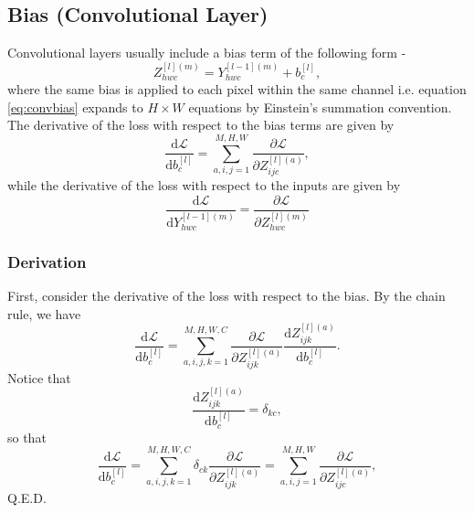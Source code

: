 \documentclass[modern]{aastex61}
\newcommand{\uderivative}{\mathrm{d}}
\begin{document}
\subsection{Bias (Convolutional Layer)} \label{sec:bias}

Convolutional layers usually include a bias term of the following form -
\begin{equation} \label{eq:convbias}
  Z^{[l](m)}_{hwc} = Y^{[l-1](m)}_{hwc} + b^{[l]}_{c},
\end{equation}
where the same bias is applied to each pixel within the same channel i.e. equation \eqref{eq:convbias} expands to $H \times W$ equations by Einstein's summation convention. The derivative of the loss with respect to the bias terms are given by
\begin{equation} \label{eq:gradconvbias}
  \frac{\uderivative \mathscr{L}}{\uderivative b^{[l]}_{c}} = \sum_{a, i, j = 1}^{M, H, W} \frac{\partial \mathscr{L}}{\partial Z^{[l](a)}_{ijc}},
\end{equation}
while the derivative of the loss with respect to the inputs are given by
\begin{equation} \label{eq:propconvbias}
  \frac{\uderivative \mathscr{L}}{\uderivative Y^{[l-1](m)}_{hwc}} = \frac{\partial \mathscr{L}}{\partial  Z^{[l](m)}_{hwc}}
\end{equation}

\subsubsection{Derivation}
First, consider the derivative of the loss with respect to the bias. By the chain rule, we have
\begin{equation*}
  \frac{\uderivative \mathscr{L}}{\uderivative b^{[l]}_{c}} = \sum_{a, i, j, k = 1}^{M, H, W, C} \frac{\partial \mathscr{L}}{\partial Z^{[l](a)}_{ijk}} \frac{\uderivative Z^{[l](a)}_{ijk}}{\uderivative b^{[l]}_{c}}.
\end{equation*}
Notice that
\begin{equation*}
  \frac{\uderivative Z^{[l](a)}_{ijk}}{\uderivative b^{[l]}_{c}} = \delta_{kc},
\end{equation*} so that
\begin{equation*}
  \frac{\uderivative \mathscr{L}}{\uderivative b^{[l]}_{c}} = \sum_{a, i, j, k = 1}^{M, H, W, C} \delta_{ck} \frac{\partial \mathscr{L}}{\partial Z^{[l](a)}_{ijk}} = \sum_{a, i, j = 1}^{M, H, W} \frac{\partial \mathscr{L}}{\partial Z^{[l](a)}_{ijc}},
\end{equation*}
Q.E.D.
\end{document}
